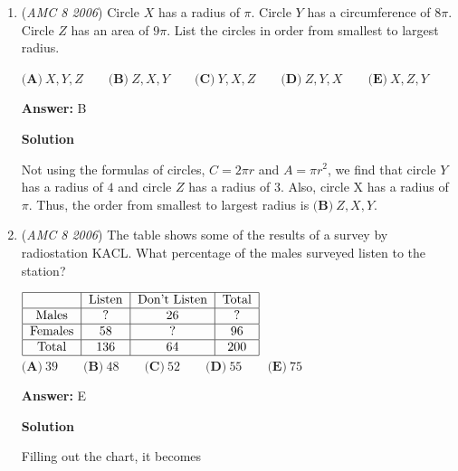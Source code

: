 \begin{enumerate}
$\textbf{(A)}\ 12\qquad\textbf{(B)}\ 16\qquad\textbf{(C)}\ 20\qquad\textbf{(D)}\ 22\qquad\textbf{(E)}\ 24$

 \textbf{Answer: }C



\textbf{Solution}

If the two rectangles were seperate, the perimeter would be $2(2(2+4)=24$. It easy to see that their connection erases 2 from each of the rectangles, so the final perimeter is $24-2 \times 2 = \boxed{\textbf{(C)}\ 20}$.

 


	\item (\textit{AMC 8 2006}) Circle $X$ has a radius of $\pi$. Circle $Y$ has a circumference of $8 \pi$. Circle $Z$ has an area of $9 \pi$. List the circles in order from smallest to largest radius. 


 $\textbf{(A)}\ X, Y, Z\qquad\textbf{(B)}\ Z, X, Y\qquad\textbf{(C)}\ Y, X, Z\qquad\textbf{(D)}\ Z, Y, X\qquad\textbf{(E)}\ X, Z, Y$

 \textbf{Answer: }B



\textbf{Solution}

Not using the formulas of circles, $C=2 \pi r$ and $A= \pi r^2$, we find that circle $Y$ has a radius of $4$ and circle $Z$ has a radius of $3$. Also, circle X has a radius of $\pi$. Thus, the order from smallest to largest radius is $\boxed{\textbf{(B)}\ Z, X, Y}$.

 


	\item (\textit{AMC 8 2006}) The table shows some of the results of a survey by radiostation KACL. What percentage of the males surveyed listen to the station? 


 $\begin{tabular}{|c|c|c|c|}\hline & Listen & Don't Listen & Total\\ \hline Males & ? & 26 & ?\\ \hline Females & 58 & ? & 96\\ \hline Total & 136 & 64 & 200\\ \hline\end{tabular}$
$\textbf{(A)}\ 39\qquad\textbf{(B)}\ 48\qquad\textbf{(C)}\ 52\qquad\textbf{(D)}\ 55\qquad\textbf{(E)}\ 75$

 \textbf{Answer: }E



\textbf{Solution}

Filling out the chart, it becomes


\end{enumerate}
